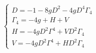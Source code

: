 \begin{equation}
\left\{
    \begin{array}{l}
    D=-1-8gD^2-4gD^4\Gamma_4
\\
    \Gamma_4=-4g+H+V
\\
    H=-4gD^2\Gamma^4+VD^2\Gamma_4
\\
    V=-4gD^2\Gamma^4+HD^2\Gamma_4
    \end{array}
    \right.
\end{equation}

